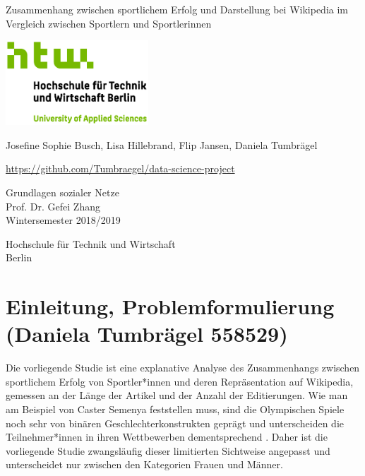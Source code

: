\documentclass[11pt]{article}
\begin{document}
\begin{titlepage}
   \begin{center}
       \vspace*{1cm}

       \Huge
       Zusammenhang zwischen sportlichem Erfolg und Darstellung bei Wikipedia im Vergleich zwischen Sportlern und Sportlerinnen
       \vspace{2.0cm}

       \includegraphics[width=0.4\textwidth]{logo.jpg}

       \vspace{1.5cm}
       \LARGE

       Josefine Sophie Busch, Lisa Hillebrand, Flip Jansen, Daniela Tumbrägel

       \vfill

		\url{https://github.com/Tumbraegel/data-science-project}
		\vfill

       Grundlagen sozialer Netze \\
       Prof. Dr. Gefei Zhang\\
       Wintersemester 2018/2019\\

       \vspace{0.8cm}

       Hochschule für Technik und Wirtschaft\\
       Berlin\\

   \end{center}
\end{titlepage}

\pagebreak
\tableofcontents
\pagebreak
\listoftables
\listoffigures
\pagebreak

\section{Einleitung, Problemformulierung (Daniela Tumbrägel 558529)}

Die vorliegende Studie ist eine explanative Analyse des Zusammenhangs zwischen sportlichem Erfolg von Sportler*innen und deren Repräsentation auf Wikipedia, gemessen an der Länge der Artikel und der Anzahl der Editierungen. Wie man am Beispiel von Caster Semenya feststellen muss, sind die Olympischen Spiele noch sehr von binären Geschlechterkonstrukten geprägt und unterscheiden die Teilnehmer*innen in ihren Wettbewerben dementsprechend \parencite{IOCRules}. Daher ist die vorliegende Studie zwangsläufig dieser limitierten Sichtweise angepasst und unterscheidet nur zwischen den Kategorien Frauen und Männer.
\end{document}

